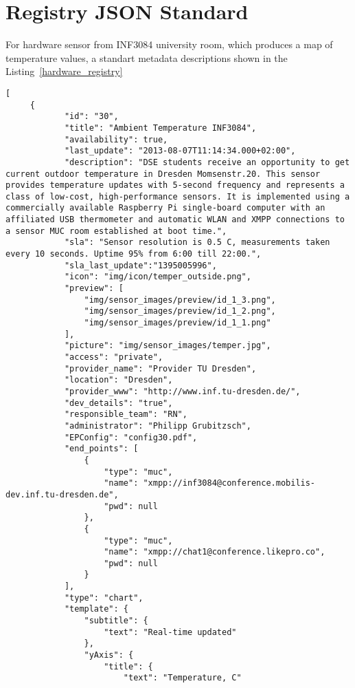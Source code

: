 \chapter{Registry JSON Standard}
For hardware sensor from INF3084 university room, which produces a map of temperature values, a standart metadata descriptions shown in the Listing~\ref{hardware_registry}
\begin{lstlisting}[label=hardware_registry,caption=JSON Description Format]
[
     {
            "id": "30",
            "title": "Ambient Temperature INF3084",
            "availability": true,
            "last_update": "2013-08-07T11:14:34.000+02:00",
            "description": "DSE students receive an opportunity to get current outdoor temperature in Dresden Momsenstr.20. This sensor provides temperature updates with 5-second frequency and represents a class of low-cost, high-performance sensors. It is implemented using a commercially available Raspberry Pi single-board computer with an affiliated USB thermometer and automatic WLAN and XMPP connections to a sensor MUC room established at boot time.",
            "sla": "Sensor resolution is 0.5 C, measurements taken every 10 seconds. Uptime 95% from 6:00 till 22:00.",
            "sla_last_update":"1395005996",
            "icon": "img/icon/temper_outside.png",
            "preview": [
                "img/sensor_images/preview/id_1_3.png",
                "img/sensor_images/preview/id_1_2.png",
                "img/sensor_images/preview/id_1_1.png"
            ],
            "picture": "img/sensor_images/temper.jpg",
            "access": "private",
            "provider_name": "Provider TU Dresden",
            "location": "Dresden",
            "provider_www": "http://www.inf.tu-dresden.de/",
            "dev_details": "true",
            "responsible_team": "RN",
            "administrator": "Philipp Grubitzsch",
            "EPConfig": "config30.pdf",
            "end_points": [
                {
                    "type": "muc",
                    "name": "xmpp://inf3084@conference.mobilis-dev.inf.tu-dresden.de",
                    "pwd": null
                },
                {
                    "type": "muc",
                    "name": "xmpp://chat1@conference.likepro.co",
                    "pwd": null
                }
            ],
            "type": "chart",
            "template": {
                "subtitle": {
                    "text": "Real-time updated"
                },
                "yAxis": {
                    "title": {
                        "text": "Temperature, C"

\end{lstlisting}
